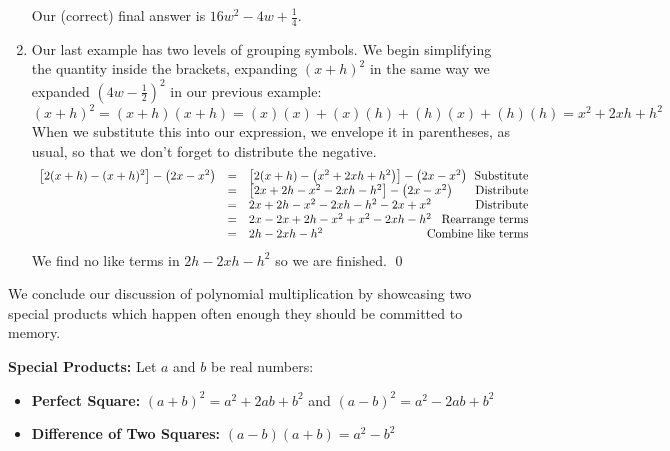 \begin{ex}
\begin{enumerate}
Our (correct) final answer is $16w^2 - 4w + \frac{1}{4}$.

\item  Our last example has two levels of grouping symbols.  We begin simplifying the quantity inside the brackets, expanding $(x+h)^2$ in the same way we expanded $(4w - \frac{1}{2})^{2}$ in our previous example: \[ (x+h)^2 = (x+h)(x+h) = (x)(x) + (x)(h) + (h)(x) + (h)(h) = x^2 + 2xh + h^2 \]  When we substitute this into our expression, we envelope it in parentheses, as usual, so that we don't forget to distribute the negative.\[ \begin{array}{rclr}
					
\left[2(x+h) - (x+h)^2\right] - \left(2x - x^2 \right) & = & \left[2(x+h) - \left( x^2 + 2xh + h^2\right) \right] - \left(2x - x^2 \right) & \hspace*{-.6in}\text{Substitute} \\
	                                                     & = & \left[2x+2h - x^2-2xh-h^2\right] - \left(2x - x^2 \right) & \hspace*{-6in} \text{Distribute}\\ 
                                                      & = & 2x+2h - x^2-2xh-h^2 -2x + x^2 & \hspace*{-.6in}\text{Distribute} \\ 
																											 & = & 2x - 2x+2h - x^2 + x^2 -2xh-h^2& \hspace*{-.6in}\text{Rearrange terms}\\
																											 & = & 2h-2xh-h^2& \hspace*{-.6in}\text{Combine like terms}\\
																											\end{array} \] We find no like terms in $2h-2xh-h^2$ so we are finished. \qed                                               

\end{enumerate}

\end{ex}



We conclude our discussion of polynomial multiplication by showcasing two special products which happen often enough they should be committed to memory.

\medskip

\colorbox{ResultColor}{\bbm

\begin{thm}\label{SpecialProducts} \textbf{Special Products:} Let $a$ and $b$ be real numbers:

\begin{itemize}

\item \textbf{Perfect Square:}  $(a+b)^2 = a^2 + 2ab + b^2$ and $(a-b)^2 = a^2 - 2ab + b^2$

\item \textbf{Difference of Two Squares:}  $(a-b)(a+b) = a^2 - b^2$ 

\end{itemize}

\end{thm}

\ebm}

